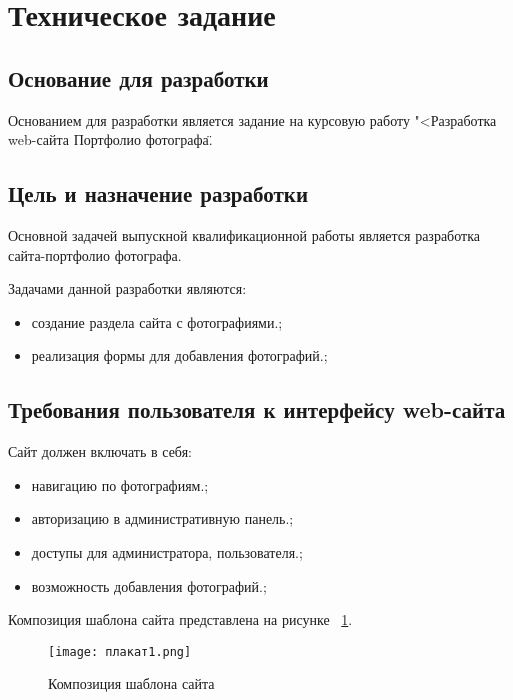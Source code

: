 \section{Техническое задание}
\subsection{Основание для разработки}

Основанием для разработки является задание на курсовую работу "<Разработка web-сайта \textquotedbl Портфолио фотографа\textquotedbl\".

\subsection{Цель и назначение разработки}

Основной задачей выпускной квалификационной работы является 
разработка сайта-портфолио фотографа.

Задачами данной разработки являются:
\begin{itemize}
\item создание раздела сайта с фотографиями.;
\item реализация формы для добавления фотографий.;
\end{itemize}

\subsection{Требования пользователя к интерфейсу web-сайта}

Сайт должен включать в себя:
\begin{itemize}
    \item навигацию по фотографиям.;
    \item авторизацию в административную панель.;
    \item доступы для администратора, пользователя.;
    \item возможность добавления фотографий.;
\end{itemize}

Композиция шаблона сайта представлена на рисунке ~\ref{maket:image}.

\begin{figure}[ht]
\texttt{[image: плакат1.png]}
\caption{Композиция шаблона сайта}
\label{maket:image}
\end{figure}

